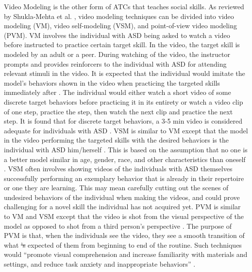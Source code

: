 \documentclass{ut-thesis}
\providecommand{\DIFaddtex}[1]{{\protect\color{blue}\uwave{#1}}} %
\providecommand{\DIFdeltex}[1]{{\protect\color{red}\sout{#1}}}                      %
\providecommand{\DIFaddbegin}{} %
\providecommand{\DIFaddend}{} %
\providecommand{\DIFdelbegin}{} %
\providecommand{\DIFdelend}{} %
\providecommand{\DIFadd}[1]{\texorpdfstring{\DIFaddtex{#1}}{#1}} %
\providecommand{\DIFdel}[1]{\texorpdfstring{\DIFdeltex{#1}}{}} %
\begin{document}
Video Modeling is the other form of ATCs that teaches social skills.  As reviewed by Shukla-Mehta et al. \cite{shukla2009evaluating}, video modeling techniques can be divided into video modeling (VM), video self-modeling (VSM), and point-of-view video modeling (PVM).  VM involves the individual with ASD being asked to watch a video before instructed to practice certain target skill.  In the video, the target skill is modeled by an adult or a peer.  During watching of the video, the instructor prompts and provides reinforcers to the individual with ASD for attending relevant stimuli in the video.  It is expected that the individual would imitate the model's behaviors shown in the video when practicing the targeted skills immediately after \cite{bellini2007meta, graetz2006show}.  The individual would either watch a short video of some discrete target behaviors before practicing it in its entirety or watch a video clip of one step, practice the step, then watch the next clip and practice the next step.  It is found that for discrete target behaviors, a 3-5 min video is considered adequate for individuals with ASD \cite{buggey2005video}.  VSM is similar to VM except that the model in the video performing the targeted skills with the desired behaviors is the individual with ASD him/herself \cite{hitchcock2003video}.  This is based on the assumption that no one is a better model similar in age, gender, race, and other characteristics than oneself \cite{bandura1969principles, buggey1999training}.  VSM often involves showing videos of the individuals with ASD themselves successfully performing an exemplary behavior that is already in their repertoire or one they are learning.  This may mean carefully cutting out the scenes of undesired behaviors of the individual when making the videos, and could prove challenging for a novel skill the individual has not acquired yet.  PVM is similar to VM and VSM except that the video is shot from the visual perspective of the model as opposed to shot from a third person's perspective \cite{hine2006using}.  The purpose of PVM is that, when the individuals see the video, they see a smooth transition of what \DIFdelbegin \DIFdel{'s }\DIFdelend \DIFaddbegin \DIFadd{is }\DIFaddend expected of them from beginning to end of the routine.  Such techniques would ``promote visual comprehension and increase familiarity with materials and settings, and reduce task anxiety and inappropriate behaviors'' \cite{shukla2009evaluating}.
\end{document}
